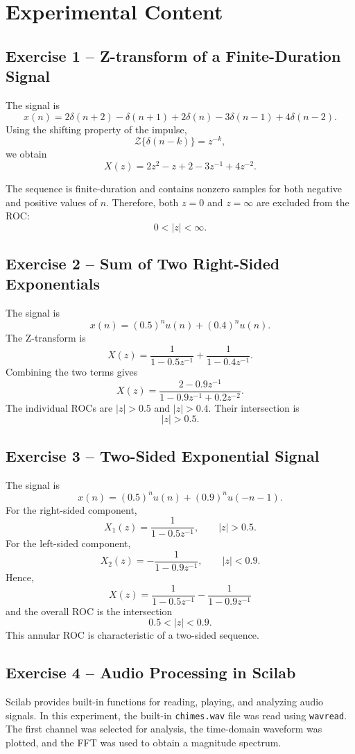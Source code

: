 \documentclass[12pt,a4paper]{article}
\begin{document}
\section{Experimental Content}

\subsection{Exercise 1 -- Z-transform of a Finite-Duration Signal}
The signal is
\[
x(n)=2\delta(n+2)-\delta(n+1)+2\delta(n)-3\delta(n-1)+4\delta(n-2).
\]
Using the shifting property of the impulse,
\[
\mathcal{Z}\{\delta(n-k)\}=z^{-k},
\]
we obtain
\[
\boxed{X(z)=2z^2-z+2-3z^{-1}+4z^{-2}}.
\]

The sequence is finite-duration and contains nonzero samples for both
negative and positive values of $n$. Therefore, both $z=0$ and
$z=\infty$ are excluded from the ROC:
\[
\boxed{0<|z|<\infty}.
\]

\subsection{Exercise 2 -- Sum of Two Right-Sided Exponentials}
The signal is
\[
x(n)=(0.5)^n u(n)+(0.4)^n u(n).
\]
The Z-transform is
\[
X(z)=\frac{1}{1-0.5z^{-1}}+\frac{1}{1-0.4z^{-1}}.
\]
Combining the two terms gives
\[
\boxed{
X(z)=\frac{2-0.9z^{-1}}
{1-0.9z^{-1}+0.2z^{-2}}
}.
\]
The individual ROCs are $|z|>0.5$ and $|z|>0.4$. Their intersection is
\[
\boxed{|z|>0.5}.
\]

\subsection{Exercise 3 -- Two-Sided Exponential Signal}
The signal is
\[
x(n)=(0.5)^n u(n)+(0.9)^n u(-n-1).
\]
For the right-sided component,
\[
X_1(z)=\frac{1}{1-0.5z^{-1}},
\qquad |z|>0.5.
\]
For the left-sided component,
\[
X_2(z)=-\frac{1}{1-0.9z^{-1}},
\qquad |z|<0.9.
\]
Hence,
\[
\boxed{
X(z)=\frac{1}{1-0.5z^{-1}}
-\frac{1}{1-0.9z^{-1}}
}
\]
and the overall ROC is the intersection
\[
\boxed{0.5<|z|<0.9}.
\]
This annular ROC is characteristic of a two-sided sequence.

\subsection{Exercise 4 -- Audio Processing in Scilab}
Scilab provides built-in functions for reading, playing, and analyzing
audio signals. In this experiment, the built-in \texttt{chimes.wav}
file was read using \texttt{wavread}. The first channel was selected for
analysis, the time-domain waveform was plotted, and the FFT was used to
obtain a magnitude spectrum.
\end{document}

